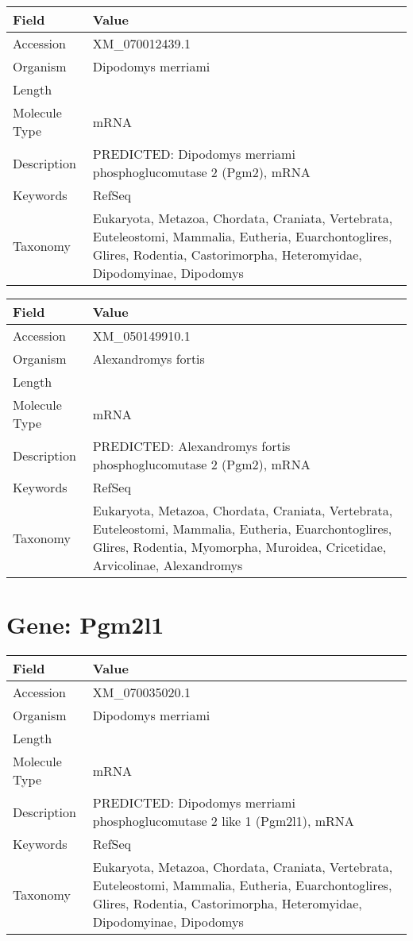 \documentclass[10pt]{article}
\begin{document}
{\footnotesize
\begin{longtable}{>{\raggedright\arraybackslash}p{4.5cm} >{\raggedright\arraybackslash}p{11.5cm}}
\textbf{Field} & \textbf{Value} \\
\hline
Accession & XM\_070012439.1 \\
Organism & Dipodomys merriami \\
Length & 2634 \\
Molecule Type & mRNA \\
Description & PREDICTED: Dipodomys merriami phosphoglucomutase 2 (Pgm2), mRNA \\
Keywords & RefSeq \\
Taxonomy & Eukaryota, Metazoa, Chordata, Craniata, Vertebrata, Euteleostomi, Mammalia, Eutheria, Euarchontoglires, Glires, Rodentia, Castorimorpha, Heteromyidae, Dipodomyinae, Dipodomys \\
\end{longtable}
}

{\footnotesize
\begin{longtable}{>{\raggedright\arraybackslash}p{4.5cm} >{\raggedright\arraybackslash}p{11.5cm}}
\textbf{Field} & \textbf{Value} \\
\hline
Accession & XM\_050149910.1 \\
Organism & Alexandromys fortis \\
Length & 2374 \\
Molecule Type & mRNA \\
Description & PREDICTED: Alexandromys fortis phosphoglucomutase 2 (Pgm2), mRNA \\
Keywords & RefSeq \\
Taxonomy & Eukaryota, Metazoa, Chordata, Craniata, Vertebrata, Euteleostomi, Mammalia, Eutheria, Euarchontoglires, Glires, Rodentia, Myomorpha, Muroidea, Cricetidae, Arvicolinae, Alexandromys \\
\end{longtable}
}


\section*{Gene: Pgm2l1}
{\footnotesize
\begin{longtable}{>{\raggedright\arraybackslash}p{4.5cm} >{\raggedright\arraybackslash}p{11.5cm}}
\textbf{Field} & \textbf{Value} \\
\hline
Accession & XM\_070035020.1 \\
Organism & Dipodomys merriami \\
Length & 8788 \\
Molecule Type & mRNA \\
Description & PREDICTED: Dipodomys merriami phosphoglucomutase 2 like 1 (Pgm2l1), mRNA \\
Keywords & RefSeq \\
Taxonomy & Eukaryota, Metazoa, Chordata, Craniata, Vertebrata, Euteleostomi, Mammalia, Eutheria, Euarchontoglires, Glires, Rodentia, Castorimorpha, Heteromyidae, Dipodomyinae, Dipodomys \\
\end{longtable}
}
\end{document}
